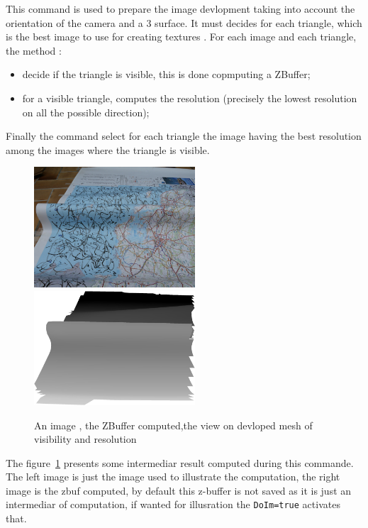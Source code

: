 This command is used to prepare the image devlopment taking into account the orientation of the
camera and a $3$ surface.  It must decides for each triangle, which is the best image to
use for creating textures . For each image and each triangle, the method :

\begin{itemize}
    \item decide if the triangle is visible, this is done copmputing a ZBuffer;
    \item for a visible triangle, computes the resolution (precisely the lowest resolution 
          on all the possible direction);
\end{itemize}

Finally the  command select for each triangle the image having the best resolution among the images where
the triangle is visible.

\begin{figure}
\centering
\includegraphics[width=6cm]{CommandReferences/ImagesComRef/Image_P1056148.jpg}
\includegraphics[width=6cm]{CommandReferences/ImagesComRef/ZBuf.jpg}
\caption{An image , the ZBuffer computed,the view on devloped mesh of visibility and resolution}
\label{fig:RealDevZB}
\end{figure}

The figure~\ref{fig:RealDevZB} presents some intermediar result computed during
this commande.  The left image is just the image used to illustrate the computation,
the right image is the zbuf computed, by default this z-buffer is not saved as it is
just an intermediar of computation, if wanted for illusration the {\tt DoIm=true} activates that.


